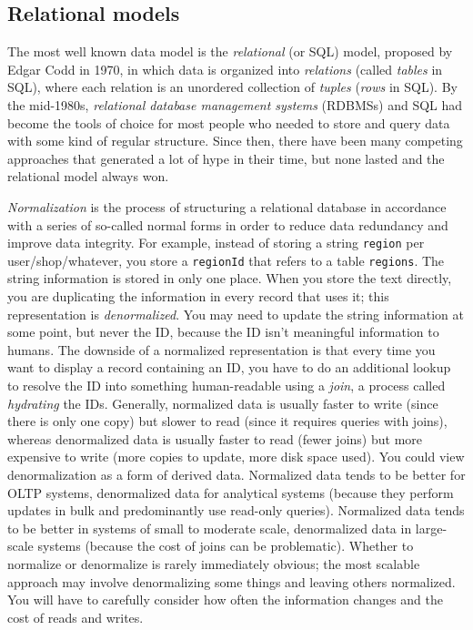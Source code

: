 \documentclass[table, xcdraw]{article}%
\begin{document}
\subsection{Relational models}

The most well known data model is the \textit{relational} (or SQL) model, proposed by Edgar Codd in 1970, in which data is organized into \textit{relations} (called \textit{tables} in SQL), where each relation is an unordered collection of \textit{tuples} (\textit{rows} in SQL). By the mid-1980s, \textit{relational database management systems} (RDBMSs) and SQL had become the tools of choice for most people who needed to store and query data with some kind of regular structure. Since then, there have been many competing approaches that generated a lot of hype in their time, but none lasted and the relational model always won.

\textit{Normalization} is the process of structuring a relational database in accordance with a series of so-called normal forms in order to reduce data redundancy and improve data integrity. For example, instead of storing a string \texttt{region} per user/shop/whatever, you store a \texttt{regionId} that refers to a table \texttt{regions}. The string information is stored in only one place. When you store the text directly, you are duplicating the information in every record that uses it; this representation is \textit{denormalized}. You may need to update the string information at some point, but never the ID, because the ID isn't meaningful information to humans. The downside of a normalized representation is that every time you want to display a record containing an ID, you have to do an additional lookup to resolve the ID into something human-readable using a \textit{join}, a process called \textit{hydrating} the IDs. Generally, normalized data is usually faster to write (since there is only one copy) but slower to read (since it requires queries with joins), whereas denormalized data is usually faster to read (fewer joins) but more expensive to write (more copies to update, more disk space used). You could view denormalization as a form of derived data. Normalized data tends to be better for OLTP systems, denormalized data for analytical systems (because they perform updates in bulk and predominantly use read-only queries). Normalized data tends to be better in systems of small to moderate scale, denormalized data in large-scale systems (because the cost of joins can be problematic). Whether to normalize or denormalize is rarely immediately obvious; the most scalable approach may involve denormalizing some things and leaving others normalized. You will have to carefully consider how often the information changes and the cost of reads and writes.
\end{document}
